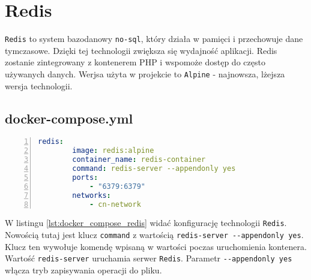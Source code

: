 \section{Redis}
\verb|Redis| to system bazodanowy \verb|no-sql|, który działa w pamięci i przechowuje dane tymczasowe. Dzięki tej technologii zwiększa się wydajność aplikacji. Redis zostanie zintegrowany z kontenerem PHP i wspomoże dostęp do często używanych danych. Werjsa użyta w projekcie to \verb|Alpine| - najnowsza, lżejsza wersja technologii.

\subsection{docker-compose.yml}
\begin{lstlisting}[language=yaml, caption={Konfiguracja kontenera Redis w pliku docker-compose.yml}, label={lst:docker_compose_redis}, numbers=left, frame=single]
    redis:
        image: redis:alpine
        container_name: redis-container
        command: redis-server --appendonly yes
        ports:
            - "6379:6379"
        networks:
            - cn-network
\end{lstlisting}

W listingu \ref{lst:docker_compose_redis} widać konfigurację technologii \verb|Redis|. Nowością tutaj jest klucz \verb|command| z wartością \verb|redis-server --appendonly yes|. Klucz ten wywołuje komendę wpisaną w wartości poczas uruchomienia kontenera. Wartość \verb|redis-server| uruchamia serwer \verb|Redis|. Parametr \verb|--appendonly yes| włącza tryb zapisywania operacji do pliku.